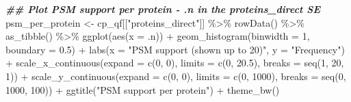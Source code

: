 \documentclass[9pt,a4paper,]{extarticle}
\newenvironment{Shaded}{\begin{snugshade}}{\end{snugshade}}
\newcommand{\AttributeTok}[1]{\textcolor[rgb]{0.77,0.63,0.00}{#1}}
\newcommand{\DecValTok}[1]{\textcolor[rgb]{0.00,0.00,0.81}{#1}}
\newcommand{\DocumentationTok}[1]{\textcolor[rgb]{0.56,0.35,0.01}{\textbf{\textit{#1}}}}
\newcommand{\FloatTok}[1]{\textcolor[rgb]{0.00,0.00,0.81}{#1}}
\newcommand{\FunctionTok}[1]{\textcolor[rgb]{0.00,0.00,0.00}{#1}}
\newcommand{\NormalTok}[1]{#1}
\newcommand{\OtherTok}[1]{\textcolor[rgb]{0.56,0.35,0.01}{#1}}
\newcommand{\SpecialCharTok}[1]{\textcolor[rgb]{0.00,0.00,0.00}{#1}}
\newcommand{\StringTok}[1]{\textcolor[rgb]{0.31,0.60,0.02}{#1}}
\begin{document}
\begin{Shaded}
\begin{Highlighting}[]
\DocumentationTok{\#\# Plot PSM support per protein {-} .n in the proteins\_direct SE}
\NormalTok{psm\_per\_protein }\OtherTok{\textless{}{-}}\NormalTok{ cp\_qf[[}\StringTok{"proteins\_direct"}\NormalTok{]] }\SpecialCharTok{\%\textgreater{}\%}
  \FunctionTok{rowData}\NormalTok{() }\SpecialCharTok{\%\textgreater{}\%}
  \FunctionTok{as\_tibble}\NormalTok{() }\SpecialCharTok{\%\textgreater{}\%}
  \FunctionTok{ggplot}\NormalTok{(}\FunctionTok{aes}\NormalTok{(}\AttributeTok{x =}\NormalTok{ .n)) }\SpecialCharTok{+}
  \FunctionTok{geom\_histogram}\NormalTok{(}\AttributeTok{binwidth =} \DecValTok{1}\NormalTok{, }\AttributeTok{boundary =} \FloatTok{0.5}\NormalTok{) }\SpecialCharTok{+}
  \FunctionTok{labs}\NormalTok{(}\AttributeTok{x =} \StringTok{"PSM support (shown up to 20)"}\NormalTok{,}
       \AttributeTok{y =} \StringTok{"Frequency"}\NormalTok{) }\SpecialCharTok{+}
  \FunctionTok{scale\_x\_continuous}\NormalTok{(}\AttributeTok{expand =} \FunctionTok{c}\NormalTok{(}\DecValTok{0}\NormalTok{, }\DecValTok{0}\NormalTok{),}
                     \AttributeTok{limits =} \FunctionTok{c}\NormalTok{(}\DecValTok{0}\NormalTok{, }\FloatTok{20.5}\NormalTok{),}
                     \AttributeTok{breaks =} \FunctionTok{seq}\NormalTok{(}\DecValTok{1}\NormalTok{, }\DecValTok{20}\NormalTok{, }\DecValTok{1}\NormalTok{)) }\SpecialCharTok{+}
  \FunctionTok{scale\_y\_continuous}\NormalTok{(}\AttributeTok{expand =} \FunctionTok{c}\NormalTok{(}\DecValTok{0}\NormalTok{, }\DecValTok{0}\NormalTok{),}
                     \AttributeTok{limits =} \FunctionTok{c}\NormalTok{(}\DecValTok{0}\NormalTok{, }\DecValTok{1000}\NormalTok{),}
                     \AttributeTok{breaks =} \FunctionTok{seq}\NormalTok{(}\DecValTok{0}\NormalTok{, }\DecValTok{1000}\NormalTok{, }\DecValTok{100}\NormalTok{)) }\SpecialCharTok{+}
  \FunctionTok{ggtitle}\NormalTok{(}\StringTok{"PSM support per protein"}\NormalTok{) }\SpecialCharTok{+}
  \FunctionTok{theme\_bw}\NormalTok{()}


\end{Highlighting}
\end{Shaded}
\end{document}
